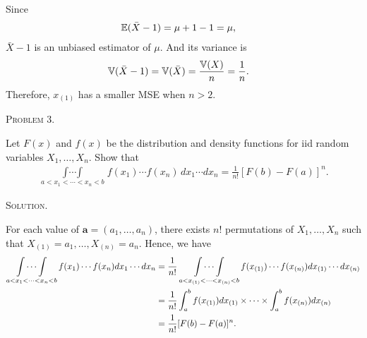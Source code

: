 \documentclass{article}
\begin{document}
\begin{CJK}{UTF8}{gbsn}
\begin{itemize}
              Since
              \begin{align}
                  {\mathbb E}(\bar{X} - 1) & = \mu + 1 - 1 = \mu,\notag
              \end{align}
              $\bar{X} - 1$ is an unbiased estimator of $\mu$.
              And its variance is
              \begin{align}
                  {\mathbb V}(\bar{X} - 1) & = {\mathbb V}(\bar{X}) = \frac{{\mathbb V}(X)}{n} =\frac{1}{n}.\notag
              \end{align}
              Therefore, $x_{(1)}$ has a smaller MSE when $n>2$.
    \end{itemize}



    \begin{shaded}
        \noindent\textsc{Problem 3.}\par
        Let $F(x)$ and $f(x)$ be the distribution and density functions for iid random variables $X_1, \ldots, X_n$.
        Show that
        \begin{align}
            \mathop{\int \cdots \int}\limits_{a<x_1< \cdots< x_n <b} f(x_1) \cdots f(x_n)\, dx_1 \cdots dx_n = \frac{1}{n!} [F(b) - F(a)]^n.
        \end{align}
    \end{shaded}
    \noindent\textsc{Solution.}\par
    For each value of $\boldsymbol{a} = (a_1, \ldots, a_n)$, there exists $n!$ permutations of $X_1, \ldots, X_n$ such that $X_{(1)} = a_1, \ldots, X_{(n)} = a_n$.
    Hence, we have
    \begin{align}
        \mathop{\int \cdots \int}_{a<x_1 <\cdots <x_n<b} f(x_1) \cdots f(x_n) dx_1\cdots dx_n & =
        \frac{1}{n!} \mathop{\int \cdots \int}_{a<x_{(1)} <\cdots <x_{(n)}<b}f(x_{(1)}) \cdots f(x_{(n)}) dx_{(1)}\cdots dx_{(n)} \notag                                                     \\
                                                                                              & =\frac{1}{n!}\int_a^bf(x_{(1)})dx_{(1)}\times \cdots \times \int_a^bf(x_{(n)})dx_{(n)}\notag \\
                                                                                              & =\frac{1}{n!}[F(b)-F(a)]^n.\notag
    \end{align}





\end{CJK}
\end{document}
